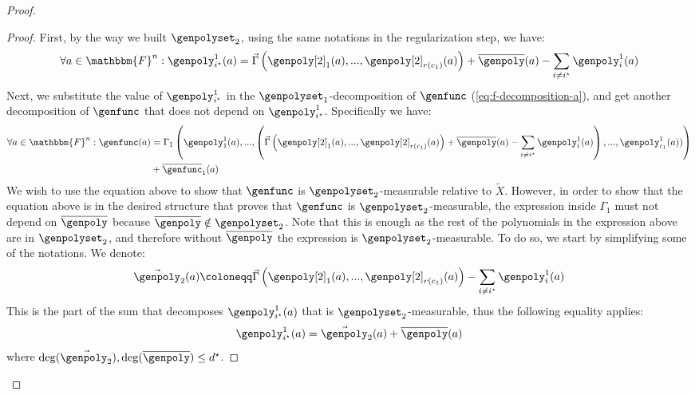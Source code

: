 \documentclass[10pt,a4paper]{article}
\newcommand{\definedas}[0]{\coloneqq}
\newcommand{\parens}[1]{\left( #1 \right)}
\newcommand{\basefield}[0]{\mathbbm{F}}
\newcommand{\blocklength}[0]{n}
\newcommand{\field}[0]{\basefield^{\blocklength}}
\newcommand{\degree}[0]{d}
\newcommand{\relativeremainder}[1]{\overline{#1}}
\newcommand{\variety}{{\tilde{X}}}
\newcommand{\rankfunc}[0]{{{{r}}}}
\begin{document}
\begin{proof}
\begin{proof}
        First, by the way we built $\genpolyset_2$, using the same notations in the regularization step, we have:
        \[
            \forall a \in \field: \genpoly_{i^\star}^1(a) =
                \vec{\Gamma} \parens {\genpoly[2]_1(a),...,\genpoly[2]_{\rankfunc(c_1)}(a)}
                + \relativeremainder{\genpoly}(a)
                - \sum_{i \neq i^\star}{\genpoly_{i}^1(a)}
        \]
        Next, we substitute the value of $\genpoly_{i^\star}^1$ in the $\genpolyset_1$-decomposition of $\genfunc$ (\ref{eq:f-decomposition-a}),
        and get another decomposition of $\genfunc$ that does not depend on $\genpoly_{i^\star}^1$.
        Specifically we have:
        \begin{align} \label{eq:f-decomposition-b}
            \forall a \in \field: \genfunc(a) &=
        \Gamma_1 \parens
            {\genpoly^{1}_{1}(a)
                ,...,
                \parens{
                    \vec{\Gamma} \parens {\genpoly[2]_1(a),...,\genpoly[2]_{\rankfunc(c_1)}(a)}
                    + \relativeremainder{\genpoly}(a)
                    - \sum_{i \neq i^\star}{\genpoly_{i}^1(a)}}
                ,...,
                \genpoly^{1}_{c_1}(a))}\\
            &+ \relativeremainder{\genfunc}_1(a)
        \end{align}
        We wish to use the equation above to show that $\genfunc$ is $\genpolyset_2$-measurable relative to $\variety$.
        However, in order to show that the equation above is in the desired structure that proves that $\genfunc$ is $\genpolyset_2$-measurable,
        the expression inside $\Gamma_1$ must not depend on $\relativeremainder{\genpoly}$ because $\relativeremainder{\genpoly} \notin \genpolyset_2$.
        Note that this is enough as the rest of the polynomials in the expression above are in $\genpolyset_2$,
        and therefore without $\relativeremainder{\genpoly}$ the expression is $\genpolyset_2$-measurable.
        \newline
        To do so, we start by simplifying some of the notations.
        We denote:
        \[
            \vec{\genpoly}_2(a) \definedas \vec{\Gamma} \parens {\genpoly[2]_1(a),...,\genpoly[2]_{\rankfunc(c_1)}(a)} - \sum_{i \neq i^\star}{\genpoly_{i}^1(a)}
        \]
        This is the part of the sum that decomposes $\genpoly_{i^\star}^1(a)$ that is $\genpolyset_2$-measurable,
        thus the following equality applies:
        \[
            \genpoly_{i^\star}^1(a) = \vec{\genpoly}_2(a) + \relativeremainder{\genpoly}(a)
        \]
        where $\deg(\vec{\genpoly_2}), \deg(\relativeremainder{\genpoly}) \leq \degree^{\star}$.

\end{proof}
\end{proof}
\end{document}
